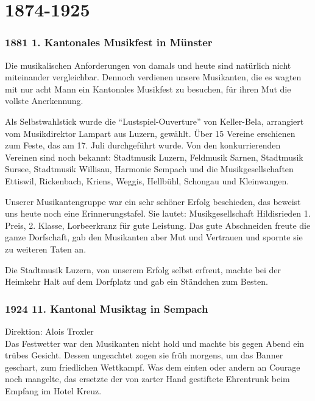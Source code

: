 \section*{1874-1925}

\begin{history}

    \subsubsection*{1881 1. Kantonales Musikfest in Münster}

    Die musikalischen Anforderungen von damals und heute sind natürlich nicht
    miteinander vergleichbar. Dennoch verdienen unsere Musikanten, die es wagten
    mit nur acht Mann ein Kantonales Musikfest zu besuchen, für ihren Mut die
    vollste Anerkennung.

    Als Selbstwahlstick wurde die \enquote{Lustspiel-Ouverture} von Keller-Bela,
    arrangiert vom Musikdirektor Lampart aus Luzern, gewählt. Über 15 Vereine
    erschienen zum Feste, das am 17. Juli durchgeführt wurde. Von den
    konkurrierenden Vereinen sind noch bekannt: Stadtmusik Luzern, Feldmusik
    Sarnen, Stadtmusik Sursee, Stadtmusik Willisau, Harmonie Sempach und die
    Musikgesellschaften Ettiswil, Rickenbach, Kriens, Weggis, Hellbühl, Schongau
    und Kleinwangen.

    Unserer Musikantengruppe war ein sehr schöner Erfolg beschieden, das beweist
    uns heute noch eine Erinnerungstafel. Sie lautet: Musikgesellschaft
    Hildisrieden 1. Preis, 2. Klasse, Lorbeerkranz für gute Leistung. Das gute
    Abschneiden freute die ganze Dorfschaft, gab den Musikanten aber Mut und
    Vertrauen und spornte sie zu weiteren Taten an.

    Die Stadtmusik Luzern, von unserem Erfolg selbst erfreut, machte bei der
    Heimkehr Halt auf dem Dorfplatz und gab ein Ständchen zum Besten.

    \subsubsection*{1924 11. Kantonal Musiktag in Sempach}

    Direktion: Alois Troxler\\
    Das Festwetter war den Musikanten nicht hold und machte bis gegen Abend ein
    trübes Gesicht. Dessen ungeachtet zogen sie früh morgens, um das Banner
    geschart, zum friedlichen Wettkampf. Was dem einten oder andern an Courage
    noch mangelte, das ersetzte der von zarter Hand gestiftete Ehrentrunk beim
    Empfang im Hotel Kreuz.


\end{history}
